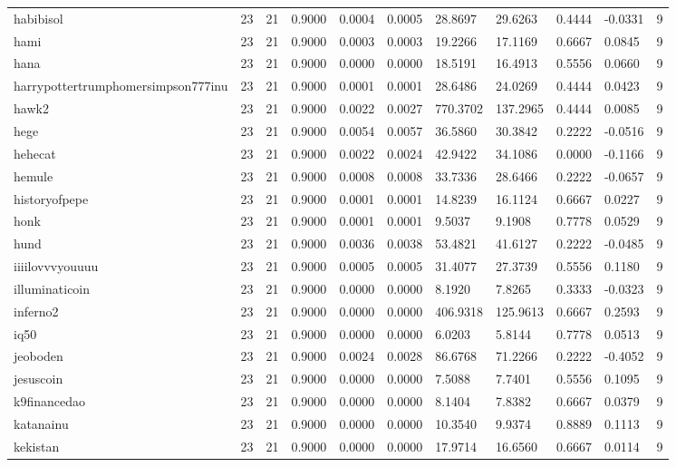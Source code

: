 \begin{table}[htbp]
\begin{tabular}{lllllllllll}
habibisol & 23 & 21 & 0.9000 & 0.0004 & 0.0005 & 28.8697 & 29.6263 & 0.4444 & -0.0331 & 9 \\
hami & 23 & 21 & 0.9000 & 0.0003 & 0.0003 & 19.2266 & 17.1169 & 0.6667 & 0.0845 & 9 \\
hana & 23 & 21 & 0.9000 & 0.0000 & 0.0000 & 18.5191 & 16.4913 & 0.5556 & 0.0660 & 9 \\
harrypottertrumphomersimpson777inu & 23 & 21 & 0.9000 & 0.0001 & 0.0001 & 28.6486 & 24.0269 & 0.4444 & 0.0423 & 9 \\
hawk2 & 23 & 21 & 0.9000 & 0.0022 & 0.0027 & 770.3702 & 137.2965 & 0.4444 & 0.0085 & 9 \\
hege & 23 & 21 & 0.9000 & 0.0054 & 0.0057 & 36.5860 & 30.3842 & 0.2222 & -0.0516 & 9 \\
hehecat & 23 & 21 & 0.9000 & 0.0022 & 0.0024 & 42.9422 & 34.1086 & 0.0000 & -0.1166 & 9 \\
hemule & 23 & 21 & 0.9000 & 0.0008 & 0.0008 & 33.7336 & 28.6466 & 0.2222 & -0.0657 & 9 \\
historyofpepe & 23 & 21 & 0.9000 & 0.0001 & 0.0001 & 14.8239 & 16.1124 & 0.6667 & 0.0227 & 9 \\
honk & 23 & 21 & 0.9000 & 0.0001 & 0.0001 & 9.5037 & 9.1908 & 0.7778 & 0.0529 & 9 \\
hund & 23 & 21 & 0.9000 & 0.0036 & 0.0038 & 53.4821 & 41.6127 & 0.2222 & -0.0485 & 9 \\
iiiilovvvyouuuu & 23 & 21 & 0.9000 & 0.0005 & 0.0005 & 31.4077 & 27.3739 & 0.5556 & 0.1180 & 9 \\
illuminaticoin & 23 & 21 & 0.9000 & 0.0000 & 0.0000 & 8.1920 & 7.8265 & 0.3333 & -0.0323 & 9 \\
inferno2 & 23 & 21 & 0.9000 & 0.0000 & 0.0000 & 406.9318 & 125.9613 & 0.6667 & 0.2593 & 9 \\
iq50 & 23 & 21 & 0.9000 & 0.0000 & 0.0000 & 6.0203 & 5.8144 & 0.7778 & 0.0513 & 9 \\
jeoboden & 23 & 21 & 0.9000 & 0.0024 & 0.0028 & 86.6768 & 71.2266 & 0.2222 & -0.4052 & 9 \\
jesuscoin & 23 & 21 & 0.9000 & 0.0000 & 0.0000 & 7.5088 & 7.7401 & 0.5556 & 0.1095 & 9 \\
k9financedao & 23 & 21 & 0.9000 & 0.0000 & 0.0000 & 8.1404 & 7.8382 & 0.6667 & 0.0379 & 9 \\
katanainu & 23 & 21 & 0.9000 & 0.0000 & 0.0000 & 10.3540 & 9.9374 & 0.8889 & 0.1113 & 9 \\
kekistan & 23 & 21 & 0.9000 & 0.0000 & 0.0000 & 17.9714 & 16.6560 & 0.6667 & 0.0114 & 9 \\

\end{tabular}
\end{table}
